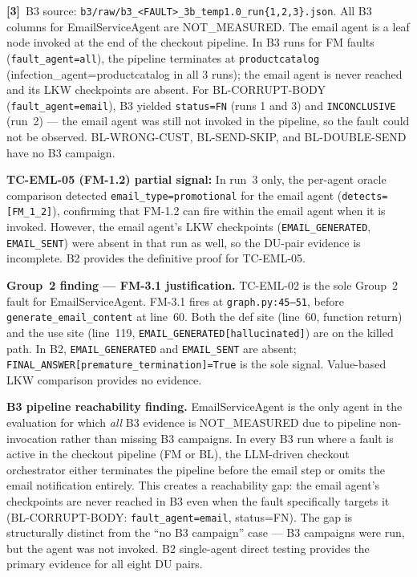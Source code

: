 \documentclass[sigconf,review,anonymous,balance=false]{acmart}
\begin{document}
\begin{table}[t]
\smallskip\par\noindent
\textbf{[3]}~B3 source: \texttt{b3/raw/b3\_<FAULT>\_3b\_temp1.0\_run\{1,2,3\}.json}.
All B3 columns for EmailServiceAgent are NOT\_MEASURED.
The email agent is a leaf node invoked at the end of the checkout pipeline.
In B3 runs for FM faults (\texttt{fault\_agent=all}), the pipeline terminates
at \texttt{productcatalog} (infection\_agent=productcatalog in all 3 runs);
the email agent is never reached and its LKW checkpoints are absent.
For BL-CORRUPT-BODY (\texttt{fault\_agent=email}), B3 yielded
\texttt{status=FN} (runs 1 and 3) and \texttt{INCONCLUSIVE} (run~2) ---
the email agent was still not invoked in the pipeline, so the fault could not
be observed.
BL-WRONG-CUST, BL-SEND-SKIP, and BL-DOUBLE-SEND have no B3 campaign.

\par\noindent\textbf{TC-EML-05 (FM-1.2) partial signal:}
In run~3 only, the per-agent oracle comparison detected
\texttt{email\_type=promotional} for the email agent
(\texttt{detects=[\textquotesingle FM\_1\_2\textquotesingle]}), confirming that
FM-1.2 can fire within the email agent when it is invoked.
However, the email agent's LKW checkpoints (\texttt{EMAIL\_GENERATED},
\texttt{EMAIL\_SENT}) were absent in that run as well, so the DU-pair evidence
is incomplete.
B2 provides the definitive proof for TC-EML-05.

\smallskip\par\noindent
\textbf{Group~2 finding --- FM-3.1 justification.}
TC-EML-02 is the sole Group~2 fault for EmailServiceAgent.
FM-3.1 fires at \texttt{graph.py:45--51}, before
\texttt{generate\_email\_content} at line~60.
Both the def site (line~60, function return) and the use site
(line~119, \texttt{EMAIL\_GENERATED[hallucinated]}) are on the killed path.
In B2, \texttt{EMAIL\_GENERATED} and \texttt{EMAIL\_SENT} are absent;
\texttt{FINAL\_ANSWER[premature\_termination]=True} is the sole signal.
Value-based LKW comparison provides no evidence.

\smallskip\par\noindent
\textbf{B3 pipeline reachability finding.}
EmailServiceAgent is the only agent in the evaluation for which \emph{all}
B3 evidence is NOT\_MEASURED due to pipeline non-invocation rather than
missing B3 campaigns.
In every B3 run where a fault is active in the checkout pipeline
(FM or BL), the LLM-driven checkout orchestrator either terminates the
pipeline before the email step or omits the email notification entirely.
This creates a reachability gap: the email agent's checkpoints are never
reached in B3 even when the fault specifically targets it
(BL-CORRUPT-BODY: \texttt{fault\_agent=email}, status=FN).
The gap is structurally distinct from the ``no B3 campaign'' case ---
B3 campaigns were run, but the agent was not invoked.
B2 single-agent direct testing provides the primary evidence for all
eight DU pairs.
\end{table}
\end{document}
